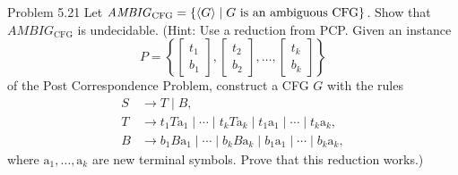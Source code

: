 \begin{question}{Problem 5.21}
Let $\mathit{AMBIG}_{\mathrm{CFG}}=\{\langle G\rangle\mid G\text{ is an ambiguous CFG}\}$. Show that $\mathit{AMBIG}_{\mathrm{CFG}}$ is undecidable. (Hint: Use a reduction from PCP. Given an instance
\[
P=\left\{\begin{bmatrix}t_1\\ b_1\end{bmatrix},
\begin{bmatrix}t_2\\ b_2\end{bmatrix},\ldots,
\begin{bmatrix}t_k\\ b_k\end{bmatrix}\right\}
\]
of the Post Correspondence Problem, construct a CFG $G$ with the rules
\begin{align*}
S&\to T\mid B,\\
T&\to t_1T\mathrm{a}_1\mid\cdots\mid t_kT\mathrm{a}_k
   \mid t_1\mathrm{a}_1\mid\cdots\mid t_k\mathrm{a}_k,\\
B&\to b_1B\mathrm{a}_1\mid\cdots\mid b_kB\mathrm{a}_k
   \mid b_1\mathrm{a}_1\mid\cdots\mid b_k\mathrm{a}_k,
\end{align*}
where $\mathrm{a}_1,\dots,\mathrm{a}_k$ are new terminal symbols. Prove that this reduction works.)
\end{question}
